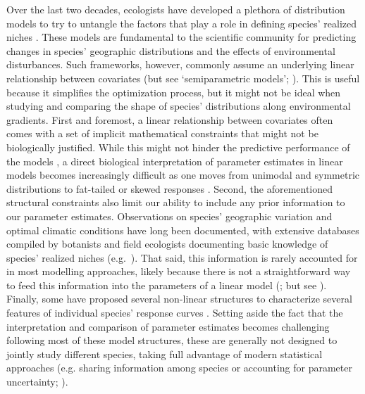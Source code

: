 \documentclass[11pt, a4paper]{article}
\begin{document}
Over the last two decades, ecologists have developed a plethora of distribution models to try to untangle the factors that play a role in defining species' realized niches \citep{guisanPredictiveHabitatDistribution2000}. These models are fundamental to the scientific community for predicting changes in species' geographic distributions and the effects of environmental disturbances. Such frameworks, however, commonly assume an underlying linear relationship between covariates (but see `semiparametric models'; \citealt{norbergComprehensiveEvaluationPredictive2019}). This is useful because it simplifies the optimization process, but it might not be ideal when studying and comparing the shape of species' distributions along environmental gradients. First and foremost, a linear relationship between covariates often comes with a set of implicit mathematical constraints that might not be biologically justified. While this might not hinder the predictive performance of the models \citep{norbergComprehensiveEvaluationPredictive2019}, a direct biological interpretation of parameter estimates in linear models becomes increasingly difficult as one moves from unimodal and symmetric distributions \citep{terbraakWeightedAveragingLogistic1986, jamilGeneralizedLinearMixed2013} to fat-tailed or skewed responses \citep{huismanHierarchicalSetModels1993}. Second, the aforementioned structural constraints also limit our ability to include any prior information to our parameter estimates. Observations on species' geographic variation and optimal climatic conditions have long been documented, with extensive databases compiled by botanists and field ecologists documenting basic knowledge of species' realized niches (e.g.~\citealt{landoltFloraIndicativaOkologische2010}). That said, this information is rarely accounted for in most modelling approaches, likely because there is not a straightforward way to feed this information into the parameters of a linear model (\citealt{scherrerEcologicalIndicatorValues2019}; but see \citealt{terbraakWeightedAveragingLogistic1986, ovaskainenHowMakeMore2017}). Finally, some have proposed several non-linear structures to characterize several features of individual species' response curves \citep{huismanHierarchicalSetModels1993}. Setting aside the fact that the interpretation and comparison of parameter estimates becomes challenging following most of these model structures, these are generally not designed to jointly study different species, taking full advantage of modern statistical approaches (e.g. sharing information among species or accounting for parameter uncertainty; \citealt{evansProcessbasedRangeModeling2016}).
\end{document}
